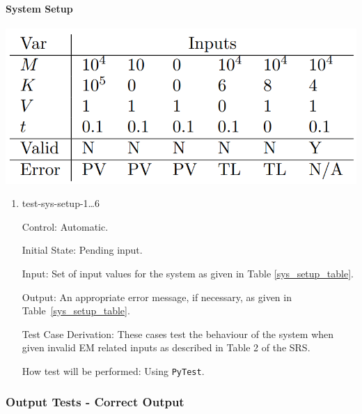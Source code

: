 \documentclass[12pt, titlepage]{article}
\begin{document}
\newpage

\paragraph{System Setup}
\begin{center}
  \includegraphics[scale=0.4]{SysInputTable.PNG} \\
  \label{sys_setup_table}
\end{center}

\begin{enumerate}

  \item{test-sys-setup-1\dots6\\}
  
  Control: Automatic.
            
  Initial State: Pending input.
            
  Input: Set of input values for the system as given in Table \ref{sys_setup_table}.
            
  Output: An appropriate error message, if necessary, as given in Table~\ref{sys_setup_table}.
  
  Test Case Derivation: These cases test the behaviour of the system when given invalid EM related inputs as described in Table 2 of the SRS.
            
  How test will be performed: Using \texttt{PyTest}. 
\end{enumerate}

\subsubsection{Output Tests - Correct Output}
\end{document}
